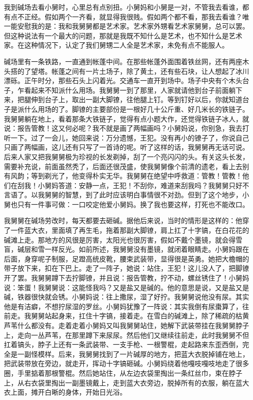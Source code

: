 我到碱场去看小舅时，心里总有点别扭。小舅妈和小舅是一对，不管我去看谁，都有点不正经。假如两个一齐看，就显得我很贱。假如两个都不看，那我去看谁？唯一能安慰我的是：我和我舅舅都是艺术家。艺术家外甥看艺术家舅舅，总可以罢。但这种说法有一个最大的问题，那就是我既不知什么是艺术，也不知什么是艺术家。在这种情况下，认定了我们舅甥二人全是艺术家，未免有点不能服人。 

碱场里有一条铁路，一直通到帐蓬中间。在那些帐蓬外面围着铁丝网，还有两座木头搭的了望塔。帐蓬之间有一片土场子，除了黄土，还有些石块，让人想起了冰川漂砾。正午时分，那些石头上闪着光。交通车一直开到场中。场子中央有个木头台子，乍看起来不知派什么用场。我舅舅一到了那里，人家就请他到台子前面躺下来，把腿伸到台子上，取出一副大脚镣，往他腿上钉。等到钉好以后，你就知道台子是派什么用场的了。脚镣的主要部份是一根好几十公斤重、好几米长的铁链子。我舅舅躺在地上，看着那条大铁链子，觉得有点小题大作，还觉得铁链子冰人，就说：报告管教！这又何必呢？我不就是画了两幅画吗？小舅妈说，你别急，我去打听一下。过了一会儿，她回来说：万分遗憾，王犯。没有再小的镣子了，你说自己只画了两幅画，这儿还有只写了一首诗的呢。听了这样的话，我舅舅再无话可说。后来人家又把我舅舅极为珍视的长发剃掉，刮了一个亮闪闪的头。有关这头长发，需要补充说，前面虽然秃了，后面还很茂盛，使我舅舅像个前清的遗老，看上去别有风韵；等到剃光了，他变得朴实无华。我舅舅在绝望中呼救道：管教！管教！他们在刮我！小舅妈答道：安静一点，王犯！不刮你，难道来刮我吗？我舅舅只好不言语了。以我舅舅的智慧，到了此时应该明白事情很不对劲。但到了这个地步，小舅也只有一件事可做：一口咬定他爱小舅妈。换了我也要这样，打死也不能改口。 

我舅舅在碱场劳改时，每天都要去砸碱。据他后来说，当时的情形是这样的：他穿了一件蓝大衣，里面填了再生毛，拖着那副大脚镣，肩上扛了十字镐，在白花花的碱滩上走。那地方的风很是厉害，太阳光也很厉害，假如不戴个墨镜，就会得雪盲，碱层和雪一样反光。如前所述，我舅舅没有墨镜，就闭着眼睛走。小舅妈跟在后面，身穿呢子制服，足蹬高统皮靴，腰束武装带，显得很是英勇。她把大檐帽的带子放下来，扣在下巴上。走了一阵子，她说：站住，王犯！这儿没人了，把脚镣开了罢。我舅舅蹲下去拧脚镣，并且说：报告管教，拧不动，螺丝锈住了！小舅妈说：笨蛋！我舅舅说：这能怪我吗？又是盐又是碱的。他的意思是说，又是盐又是碱，铁器很快就会锈。小舅妈说：往上撒尿，湿了好拧。我舅舅说他没有尿。其实他是有洁癖，不想拧尿湿的罗丝。小舅妈犹豫了一阵说：其实我倒有尿棗算了，往前走。我舅舅站起身来，扛住十字镐，接着走。在雪白的碱滩上，除了稀疏的枯黄芦苇什么都没有。走着走着小舅妈又叫我舅舅站住，她解下武装带挂在我舅舅脖子上，走向一丛芦苇，在那里蹲下来尿尿。然后他们又继续往前走，此时我舅舅不但扛着镐头，脖子上还有一条武装带、一支手枪、一根警棍，走起路来东歪西倒，完全是一副怪模样。后来，我舅舅找到了一片碱厚的地方，把蓝大衣脱掉铺在地上，把武装带放在旁边，就走开，挥动十字镐砸碱。小舅妈绕着他嘎吱嘎吱地走了很多圈，手里掂着那根警棍。然后她站住，从左边衣袋里掏出一条红丝巾，束在脖子上，从右衣袋里掏出一副墨镜戴上，走到蓝大衣旁边，脱掉所有的衣服，躺在蓝大衣上面，摊开白晰的身体，开始日光浴。 

